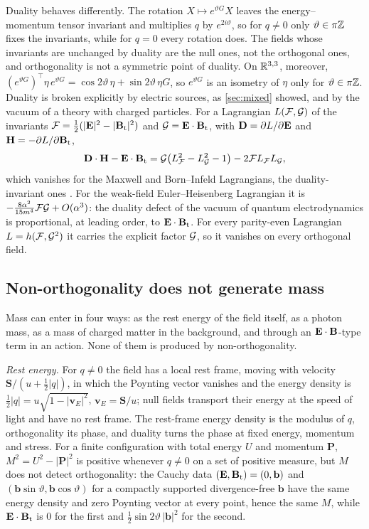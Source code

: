 Duality behaves differently. The rotation $X\mapsto e^{\vartheta G}X$ leaves the energy--momentum tensor invariant and multiplies $q$ by
$e^{2i\vartheta}$, so for $q\neq0$ only $\vartheta\in\pi\mathbb{Z}$ fixes the invariants, while for $q=0$ every rotation does. The fields whose
invariants are unchanged by duality are the null ones, not the orthogonal ones, and orthogonality is not a symmetric point of duality.
On $\mathbb{R}^{3,3}$, moreover, $(e^{\vartheta G})^{\!\top}\eta\,e^{\vartheta G}=\cos2\vartheta\,\eta+\sin2\vartheta\,\eta G$, so $e^{\vartheta G}$ is an
isometry of $\eta$ only for $\vartheta\in\pi\mathbb{Z}$. Duality is broken explicitly by electric sources, as \cref{sec:mixed} showed, and by the
vacuum of a theory with charged particles. For a Lagrangian $L(\mathcal F,\mathcal G)$ of the invariants $\mathcal F=\tfrac12(|\mathbf E|^2-|\mathbf B_{\rm t}|^2)$ and
$\mathcal G=\mathbf E\cdot\mathbf B_{\rm t}$, with $\mathbf D=\partial L/\partial\mathbf E$ and $\mathbf H=-\partial L/\partial\mathbf B_{\rm t}$,
\[
\mathbf D\cdot\mathbf H-\mathbf E\cdot\mathbf B_{\rm t}=\mathcal G\bigl(L_\mathcal F^2-L_\mathcal G^2-1\bigr)-2\mathcal F L_\mathcal F L_\mathcal G ,
\]
which vanishes for the Maxwell and Born--Infeld Lagrangians, the duality-invariant ones \cite{GaillardZumino81,GibbonsRasheed95}. For the
weak-field Euler--Heisenberg Lagrangian \cite{HeisenbergEuler36,Dunne04} it is $-\tfrac{8\alpha^2}{15m^4}\mathcal F\mathcal G+O(\alpha^3)$: the duality
defect of the vacuum of quantum electrodynamics is proportional, at leading order, to $\mathbf E\cdot\mathbf B_{\rm t}$. For every parity-even Lagrangian
$L=h(\mathcal F,\mathcal G^2)$ it carries the explicit factor $\mathcal G$, so it vanishes on every orthogonal field.

\subsection{Non-orthogonality does not generate mass}
\label{sec:orth:nomass}

Mass can enter in four ways: as the rest energy of the field itself, as a photon mass, as a mass of charged matter in the background, and
through an $\mathbf E\cdot\mathbf B$-type term in an action. None of them is produced by non-orthogonality.

\emph{Rest energy.} For $q\neq0$ the field has a local rest frame, moving with velocity $\mathbf S/(u+\tfrac12|q|)$, in which the Poynting
vector vanishes and the energy density is $\tfrac12|q|=u\sqrt{1-|\mathbf v_E|^2}$, $\mathbf v_E=\mathbf S/u$; null fields transport their
energy at the speed of light and have no rest frame. The rest-frame energy density is the modulus of $q$, orthogonality its phase, and
duality turns the phase at fixed energy, momentum and stress. For a finite configuration with total energy $U$ and momentum $\mathbf P$,
$M^2=U^2-|\mathbf P|^2$ is positive whenever $q\neq0$ on a set of positive measure, but $M$ does not detect orthogonality: the Cauchy data
$(\mathbf E,\mathbf B_{\rm t})=(0,\mathbf b)$ and $(\mathbf b\sin\vartheta,\mathbf b\cos\vartheta)$ for a compactly supported divergence-free $\mathbf b$ have the same
energy density and zero Poynting vector at every point, hence the same $M$, while $\mathbf E\cdot\mathbf B_{\rm t}$ is $0$ for the first and
$\tfrac12\sin2\vartheta\,|\mathbf b|^2$ for the second.

